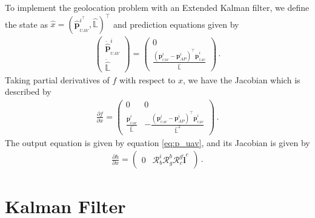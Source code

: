 To implement the geolocation problem with an Extended Kalman filter, we define the state as $\hat{x}=(\hat{\boldsymbol{p}}_{_{UAV}}^{i^\top},\hat{\mathbb{L}})^\top$ and prediction equations given by
\begin{align*}
\begin{pmatrix}
\dot{\hat{\boldsymbol{p}}}_{_{UAV}}^i \\
\dot{\hat{\mathbb{L}}}
\end{pmatrix}
=
\begin{pmatrix}
0 \\
\frac{(\boldsymbol{p}_{_{UAV}}^i-\boldsymbol{p}_{AP}^i)^\top\dot{\boldsymbol{p}}_{_{UAV}}^i}{\hat{\mathbb{L}}}
\end{pmatrix}\,.
\end{align*}
Taking partial derivatives of $f$ with respect to $x$, we have the Jacobian which is described by
\begin{align*}
\frac{\partial f}{\partial x}=
\begin{pmatrix}
0 & 0 \\
\frac{\dot{\boldsymbol{p}}_{_{UAV}}^i}{\hat{\mathbb{L}}} & -\frac{(\boldsymbol{p}_{_{UAV}}^i-\boldsymbol{p}_{AP}^i)^\top\dot{\boldsymbol{p}}_{_{UAV}}^i}{\hat{\mathbb{L}}^2}
\end{pmatrix}\,.
\end{align*}
The output equation is given by equation \ref{eq:p_uav}, and its Jacobian is given by
\begin{align*}
\frac{\partial h}{\partial x}=
\begin{pmatrix}
0 & \mathcal{R}_b^i\mathcal{R}_g^b\mathcal{R}_c^g\check{\boldsymbol{l}}^c
\end{pmatrix}\,.
\end{align*}

\pagebreak
\section{Kalman Filter}{\label{sect:kalman_filter}}

